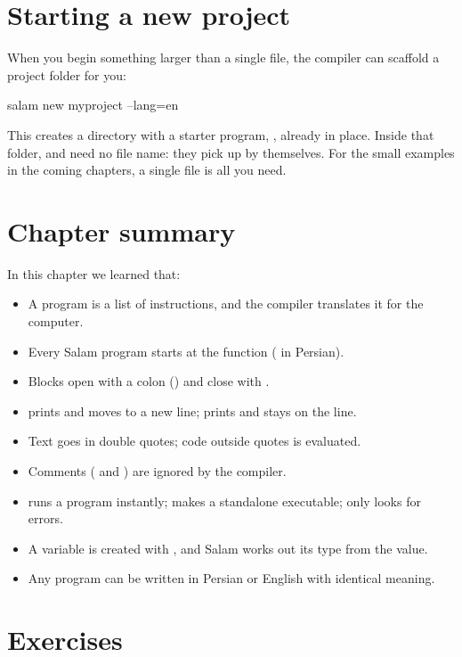 \section{Starting a new project}

When you begin something larger than a single file, the compiler can scaffold a
project folder for you:

\begin{shell}
salam new myproject --lang=en
\end{shell}

This creates a  directory with a starter program,
, already in place. Inside that folder, 
and  need no file name: they pick up  by
themselves. For the small examples in the
coming chapters, a single  file is all you need.

\section{Chapter summary}

In this chapter we learned that:
\begin{itemize}[leftmargin=1.4em]
  \item A program is a list of instructions, and the compiler 
        translates it for the computer.
  \item Every Salam program starts at the  function
        ( in Persian).
  \item Blocks open with a colon (\code{:}) and close with .
  \item {} prints and moves to a new line;  prints and
        stays on the line.
  \item Text goes in double quotes; code outside quotes is evaluated.
  \item Comments (\code{//} and ) are ignored by the compiler.
  \item {} runs a program instantly;  makes a
        standalone executable;  only looks for errors.
  \item A variable is created with \code{:=}, and Salam works out its type
        from the value.
  \item Any program can be written in Persian or English with identical meaning.
\end{itemize}

\section{Exercises}

